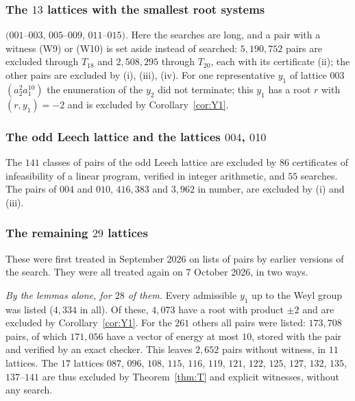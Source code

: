 \documentclass[11pt]{amsart}
\theoremstyle{definition}
\theoremstyle{remark}
\begin{document}
\subsubsection*{The $13$ lattices with the smallest root systems} $(001$--$003$, $005$--$009$, $011$--$015)$. Here the
searches are long, and a pair with a witness (W9) or (W10) is set aside instead of searched: $5{,}190{,}752$ pairs are
excluded through $T_{18}$ and $2{,}508{,}295$ through $T_{20}$, each with its certificate (ii); the other pairs are excluded
by (i), (iii), (iv). For one representative $y_1$ of lattice $003$ $(a_2^2a_1^{10})$ the enumeration of the $y_2$ did not
terminate; this $y_1$ has a root $r$ with $(r,y_1)=-2$ and is excluded by Corollary~\ref{cor:Y1}.

\subsubsection*{The odd Leech lattice and the lattices $004$, $010$} The $141$ classes of pairs of the odd Leech lattice are
excluded by $86$ certificates of infeasibility of a linear program, verified in integer arithmetic, and $55$ searches. The
pairs of $004$ and $010$, $416{,}383$ and $3{,}962$ in number, are excluded by (i) and (iii).

\subsubsection*{The remaining $29$ lattices} These were first treated in September 2026 on lists of pairs by earlier
versions of the search. They were all treated again on 7 October 2026, in two ways.

\emph{By the lemmas alone, for $28$ of them.} Every admissible $y_1$ up to the Weyl group was listed ($4{,}334$ in all). Of
these, $4{,}073$ have a root with product $\pm2$ and are excluded by Corollary~\ref{cor:Y1}. For the $261$ others all pairs
were listed: $173{,}708$ pairs, of which $171{,}056$ have a vector of energy at most $10$, stored with the pair and verified
by an exact checker. This leaves $2{,}652$ pairs without witness, in $11$ lattices. The $17$ lattices $087$, $096$, $108$,
$115$, $116$, $119$, $121$, $122$, $125$, $127$, $132$, $135$, $137$--$141$ are thus excluded by
Theorem~\ref{thm:T} and explicit witnesses, without any search.
\end{document}

